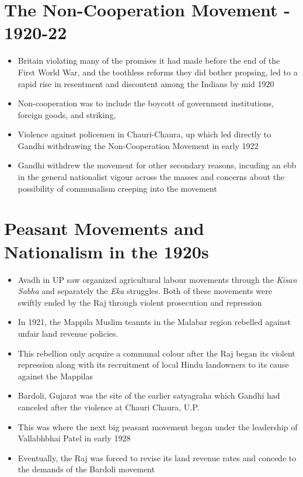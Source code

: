 \section{The Non-Cooperation Movement - 1920-22}
\begin{itemize}
    \item Britain violating many of the promises it had made before the end of the First World War, and the toothless reforms they did bother propsing, led to a rapid rise in resentment and discontent among the Indians by mid 1920
    \item Non-cooperation was to include the boycott of government institutions, foreign goods, and striking,
    \item Violence against policemen in Chauri-Chaura, \gls{up} which led directly to Gandhi withdrawing the Non-Cooperation Movement in early 1922
    \item Gandhi withdrew the movement for other secondary reasons, incuding an ebb in the general nationalist vigour across the masses and concerns about the possibility of communalism creeping into the movement
\end{itemize}

\section{Peasant Movements and Nationalism in the 1920s}
\begin{itemize}
    \item Avadh in UP saw organized agricultural labour movements through the \textit{Kisan Sabha} and separately the \textit{Eka} struggles. Both of these movements were swiftly ended by the Raj through violent prosecution and repression
    \item In 1921, the Mappila Muslim teannts in the Malabar region rebelled against unfair land revenue policies.
    \item This rebellion only acquire a communal colour after the Raj began its violent repression along with its recruitment of local Hindu landowners to its cause against the Mappilas
    \item Bardoli, Gujarat was the site of the earlier satyagraha which Gandhi had canceled after the violence at Chauri Chaura, U.P.
    \item This was where the next big peasant movement began under the leadership of Vallabhbhai Patel in early 1928
    \item Eventually, the Raj was forced to revise its land revenue rates and concede to the demands of the Bardoli movement
\end{itemize}

